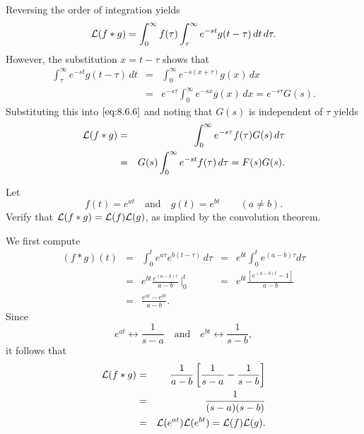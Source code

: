 \documentclass{ximera}
\begin{document}

Reversing the order of integration yields
\begin{equation}\label{eq:8.6.6}
{\cal L}(f\ast g)=\int_0^\infty f(\tau)\int^\infty_\tau e^{-st}g(t-\tau)\,
dt
\,d\tau.
\end{equation}
However, the substitution $x=t-\tau$ shows that
\begin{eqnarray*}
\int^\infty_\tau e^{-st}g(t-\tau)\,dt&=&\int_0^\infty
e^{-s(x+\tau)}g(x)\,dx\\
&=&e^{-s\tau}\int_0^\infty e^{-sx}g(x)\,dx=e^{-s\tau}G(s).
\end{eqnarray*}
Substituting this into  $\eqref{eq:8.6.6}$ and noting that $G(s)$ is
independent of $\tau$ yields
\begin{eqnarray*}
{\cal L}(f\ast g)&=&\int_0^\infty e^{-s\tau} f(\tau)G(s)\,d\tau\\
&=&G(s)\int_0^\infty e^{-st}f(\tau)\,d\tau=F(s)G(s).
\end{eqnarray*}


\begin{example}\label{example:8.6.1}
 Let
$$
f(t)=e^{at}\quad\mbox{and}\quad  g(t)=e^{bt}\qquad (a\ne b).
$$
Verify that ${\cal L}(f\ast g)={\cal L}(f){\cal L}(g)$, as
implied by the convolution theorem.
\begin{explanation}
We first compute
$$
\begin{array}{ccccc}
(f\ast g)(t)&=&\int_0^t e^{a\tau}e^{b(t-\tau)}\,d\tau
&=&e^{bt}\int_0^t e^{(a-b)\tau} d\tau\\
&=&e^{bt} \frac{e^{(a-b)\tau}}{ a-b}\,\bigg|^t_0&=&
e^{bt}\frac{\left[e^{(a-b)t}-1\right]}{a-b}\\
&=&\frac{e^{at}-e^{bt}}{a-b}.
\end{array}
$$
Since
$$
e^{at}\leftrightarrow \frac{1}{s-a}\quad\mbox{and}\quad
e^{bt}\leftrightarrow \frac{1}{s-b},
$$
it follows that
\begin{eqnarray*}
{\cal L}(f\ast g)&=&\frac{1}{a-b}\left[\frac{1}{s-a}-\frac{1}{s-b}\right]\\
&=&\frac{1}{(s-a)(s-b)}\\
&=&{\cal L}(e^{at}){\cal L}(e^{bt})={\cal L}(f){\cal L}(g).
\end{eqnarray*}
\end{explanation}
\end{example}
\end{document}
